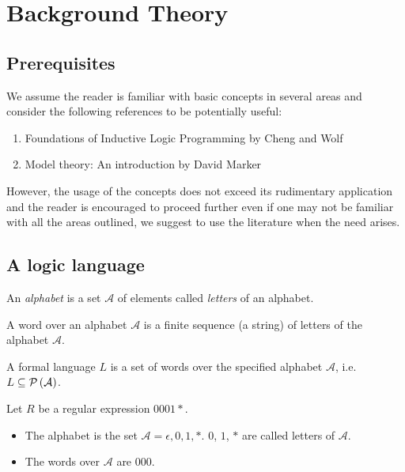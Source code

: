 
\chapter{Background Theory}

\section{Prerequisites}
We assume the reader is familiar with basic concepts in several areas and consider the following references to be potentially useful:
\begin{enumerate}
\item Foundations of Inductive Logic Programming by Cheng and Wolf \cite{nienhuys1997foundations}
\item Model theory: An introduction by David Marker \cite{marker2002model}
\end{enumerate}
However, the usage of the concepts does not exceed its rudimentary application and the reader is encouraged to proceed further even if one may not be familiar with all the areas outlined, we suggest to use the literature when the need arises.
\section{A logic language}
\begin{defn}
An \emph{alphabet} is a set $\mathcal{A}$ of elements called \emph{letters} of an alphabet.
\end{defn}

\begin{defn}
A word over an alphabet $\mathcal{A}$ is a finite sequence (a string) of letters of the alphabet $\mathcal{A}$.
\end{defn}

\begin{defn}
A formal language $L$ is a set of words over the specified alphabet $\mathcal{A}$, i.e. $L \subseteq \mathcal{P} \left({ \mathcal{A} }\right)$.
\end{defn}

\begin{exmp}
Let $R$ be a regular expression $0001*$.
\begin{itemize}
\item The alphabet is the set $\mathcal{A}={\epsilon, 0,1,*}$. $0$, $1$, $*$ are called letters of $\mathcal{A}$.
\item The words over $\mathcal{A}$ are $000$.
\end{itemize}
\end{exmp}

